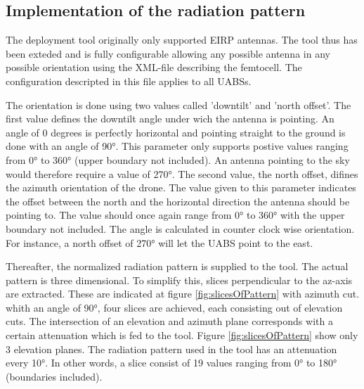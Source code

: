 \subsection{Implementation of the radiation pattern}
The deployment tool originally only supported EIRP antennas. The tool thus has been exteded and is fully configurable allowing any possible antenna in any possible 
orientation using the XML-file describing the femtocell. The configuration descripted in this file applies to all \gls{UABS}s. 

The orientation is done using two values called 'downtilt' and 'north offset'. The first value
defines the downtilt angle under wich the antenna is pointing. An angle of 0 degrees is perfectly horizontal and pointing straight to the ground is done with an angle of \ang{90}.
This parameter only supports postive values ranging from \ang{0} to \ang{360} (upper boundary not included). An antenna pointing to the sky would therefore require a value of \ang{270}.
The second value, the north offset, difines the azimuth orientation of the drone. The value given to this parameter indicates the offset between the north
and the horizontal direction the antenna should be pointing to. The value should once again range from \ang{0} to \ang{360} with the upper boundary not included. The
angle is calculated in counter clock wise orientation. For instance, a north offset of \ang{270} will let the \gls{UABS} point to the east.  

Thereafter, the normalized radiation pattern is supplied to the tool. The actual pattern is three dimensional. To simplify this,
slices perpendicular to the az-axis are extracted. These are indicated at figure \ref{fig:slicesOfPattern} with azimuth cut. whith
an angle of \ang{90}, four slices are achieved, each consisting out of elevation cuts. The intersection of an elevation and azimuth plane 
corresponds with a certain attenuation which is fed to the tool. Figure \ref{fig:slicesOfPattern} show only 3 elevation planes. The radiation pattern used in the tool 
has an attenuation every \ang{10}. In other words, a slice consist of 19 values ranging from \ang{0} to \ang{180} (boundaries included).

